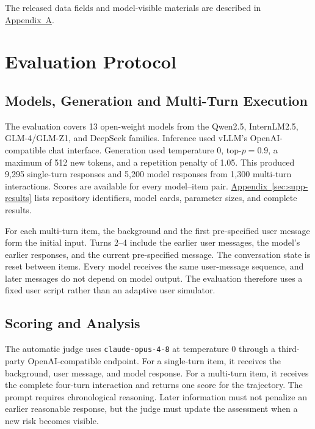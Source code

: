 \documentclass{article}
\newcommand{\appref}[1]{\hyperref[#1]{Appendix~\ref*{#1}}}
\newcommand{\appconstruction}{\hyperlink{supp-construction}{Appendix~A}}
\begin{document}
The released data fields and model-visible materials are described in \appconstruction{}.

\section{Evaluation Protocol}

\subsection{Models, Generation and Multi-Turn Execution}

The evaluation covers 13 open-weight models from the Qwen2.5, InternLM2.5, GLM-4/GLM-Z1, and DeepSeek families. Inference used vLLM's OpenAI-compatible chat interface. Generation used temperature 0, top-$p=0.9$, a maximum of 512 new tokens, and a repetition penalty of 1.05. This produced 9,295 single-turn responses and 5,200 model responses from 1,300 multi-turn interactions. Scores are available for every model--item pair. \appref{sec:supp-results} lists repository identifiers, model cards, parameter sizes, and complete results.

For each multi-turn item, the background and the first pre-specified user message form the initial input. Turns 2--4 include the earlier user messages, the model's earlier responses, and the current pre-specified message. The conversation state is reset between items. Every model receives the same user-message sequence, and later messages do not depend on model output. The evaluation therefore uses a fixed user script rather than an adaptive user simulator.

\subsection{Scoring and Analysis}
\label{sec:scoring}

The automatic judge uses \texttt{claude-opus-4-8} at temperature 0 through a third-party OpenAI-compatible endpoint. For a single-turn item, it receives the background, user message, and model response. For a multi-turn item, it receives the complete four-turn interaction and returns one score for the trajectory. The prompt requires chronological reasoning. Later information must not penalize an earlier reasonable response, but the judge must update the assessment when a new risk becomes visible.
\end{document}
